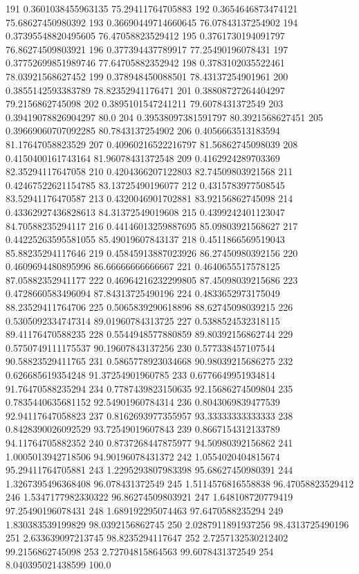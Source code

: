 {191 0.3601038455963135 75.29411764705883
192 0.3654646873474121 75.68627450980392
193 0.36690449714660645 76.07843137254902
194 0.37395548820495605 76.47058823529412
195 0.3761730194091797 76.86274509803921
196 0.377394437789917 77.25490196078431
197 0.37752699851989746 77.64705882352942
198 0.3783102035522461 78.03921568627452
199 0.378948450088501 78.43137254901961
200 0.3855142593383789 78.82352941176471
201 0.38808727264404297 79.2156862745098
202 0.3895101547241211 79.6078431372549
203 0.39419078826904297 80.0
204 0.39538097381591797 80.3921568627451
205 0.39669060707092285 80.7843137254902
206 0.4056663513183594 81.17647058823529
207 0.40960216522216797 81.56862745098039
208 0.4150400161743164 81.96078431372548
209 0.4162924289703369 82.35294117647058
210 0.4204366207122803 82.74509803921568
211 0.42467522621154785 83.13725490196077
212 0.4315783977508545 83.52941176470587
213 0.4320046901702881 83.92156862745098
214 0.43362927436828613 84.31372549019608
215 0.4399242401123047 84.70588235294117
216 0.44146013259887695 85.09803921568627
217 0.44225263595581055 85.49019607843137
218 0.4511866569519043 85.88235294117646
219 0.45845913887023926 86.27450980392156
220 0.4609694480895996 86.66666666666667
221 0.4640655517578125 87.05882352941177
222 0.46964216232299805 87.45098039215686
223 0.4728660583496094 87.84313725490196
224 0.4833652973175049 88.23529411764706
225 0.5065839290618896 88.62745098039215
226 0.5305092334747314 89.01960784313725
227 0.5388524532318115 89.41176470588235
228 0.5544948577880859 89.80392156862744
229 0.5750749111175537 90.19607843137256
230 0.577338457107544 90.58823529411765
231 0.5865778923034668 90.98039215686275
232 0.626685619354248 91.37254901960785
233 0.6776649951934814 91.76470588235294
234 0.7787439823150635 92.15686274509804
235 0.7835440635681152 92.54901960784314
236 0.8043069839477539 92.94117647058823
237 0.8162693977355957 93.33333333333333
238 0.8428390026092529 93.72549019607843
239 0.8667154312133789 94.11764705882352
240 0.8737268447875977 94.50980392156862
241 1.0005013942718506 94.90196078431372
242 1.0554020404815674 95.29411764705881
243 1.2295293807983398 95.68627450980391
244 1.3267395496368408 96.078431372549
245 1.5114576816558838 96.47058823529412
246 1.5347177982330322 96.86274509803921
247 1.648108720779419 97.25490196078431
248 1.689192295074463 97.6470588235294
249 1.830383539199829 98.0392156862745
250 2.0287911891937256 98.4313725490196
251 2.633639097213745 98.8235294117647
252 2.7257132530212402 99.2156862745098
253 2.72704815864563 99.6078431372549
254 8.040395021438599 100.0
}\tableexpivecdfrlactcrishev
